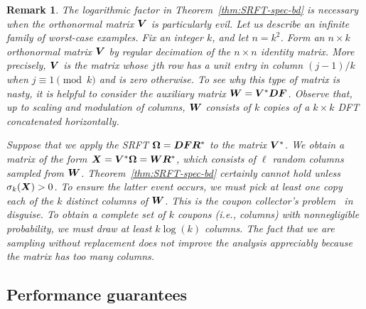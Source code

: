 \documentclass[final]{siamltex}
\newcommand{\pgnotate}[1]{{\color{blue}[#1]}}
\newtheorem{remark}{Remark}[section]
\begin{document}
\begin{remark} \label{rem:coupon} \rm
The logarithmic factor in Theorem~\ref{thm:SRFT-spec-bd} is \emph{necessary} when the orthonormal matrix $\bm{V}$ is particularly evil.  Let us describe an infinite family of worst-case examples.  Fix an integer $k$, and let $n = k^2$.  Form an
$n \times k$ orthonormal matrix $\bm{V}$ by regular decimation of the $n \times n$ identity matrix.  More precisely, $\bm{V}$ is the matrix whose $j$th row has a unit entry in column $(j - 1)/k$ when $j \equiv 1 \pmod{k}$ and is zero otherwise.
To see why this type of matrix is nasty, it is helpful to consider the auxiliary matrix $\bm{W} = \bm{V}^* \bm{DF}$.  Observe that, up to scaling and modulation of columns, $\bm{W}$ consists of $k$ copies of a $k \times k$ DFT concatenated horizontally.

Suppose that we apply the SRFT $\bm{\Omega} = \bm{DFR}^*$ to the matrix $\bm{V}^*$.  We obtain a matrix of the form $\bm{X} = \bm{V}^* \bm{\Omega} = \bm{WR}^*$, which consists of $\ell$ random columns sampled from $\bm{W}$.
Theorem~\ref{thm:SRFT-spec-bd} certainly cannot hold unless $\sigma_k(\bm{X}) > 0$.  To ensure the latter event occurs, we must pick at least one copy each of the $k$ distinct columns of $\bm{W}$.  This is the coupon collector's problem~\cite[Sec.~3.6]{MR95:Randomized-Algorithms} in disguise.  To obtain a complete set of $k$ coupons (i.e., columns) with nonnegligible probability, we must draw at least $k \log(k)$ columns.  The fact that we are sampling without replacement does not improve
the analysis appreciably because the matrix has too many columns.
\end{remark}



\lsp


\subsection{Performance guarantees}
\end{document}
